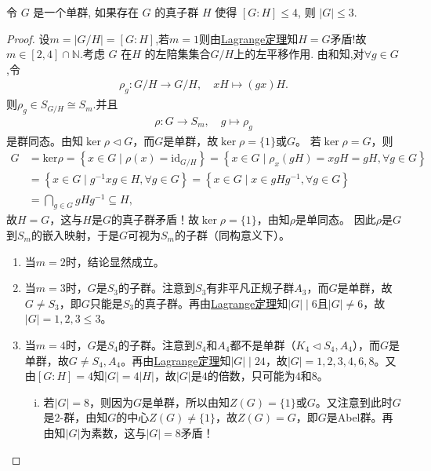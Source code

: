 \documentclass[../../main.tex]{subfiles}%
\begin{document}
\begin{example}
令 $G$ 是一个单群, 如果存在 $G$ 的真子群 $H$ 使得 $[G:H] \leqslant 4$, 则 $|G| \leqslant 3$.
\end{example}
\begin{proof}
设$m=|G/H|=[G:H]$,若$m=1$则由\hyperref[theorem:抽象代数--Lagrange定理]{Lagrange定理}知$H=G$矛盾!故$m\in [2,4]\cap \mathbb{N}$.考虑 $G$ 在$H$ 的左陪集集合$G/H$上的左平移作用. 由和知,对$\forall g\in G$,令
\begin{align*}
\rho_g:G/H\rightarrow G/H,\quad xH\mapsto (gx)H.
\end{align*}
则$\rho_g\in S_{G/H}\cong S_m$.并且
\begin{align*}
\rho:G\rightarrow S_m,\quad g\mapsto \rho_g
\end{align*}
是群同态。由知$\ker\rho\lhd G$，而$G$是单群，故$\ker\rho=\{1\}$或$G$。
若$\ker\rho=G$，则
\begin{align*}
G&=\mathrm{ker}\rho =\left\{ x\in G\mid \rho \left( x \right) =\mathrm{id}_{G/H} \right\} =\left\{ x\in G\mid \rho _x\left( gH \right) =xgH=gH,\forall g\in G \right\} 
\\
&=\left\{ x\in G\mid g^{-1}xg\in H,\forall g\in G \right\} =\left\{ x\in G\mid x\in gHg^{-1},\forall g\in G \right\} 
\\
&=\bigcap_{g\in G}{gHg^{-1}}\subseteq H,
\end{align*}
故$H=G$，这与$H$是$G$的真子群矛盾！故$\ker\rho=\{1\}$，由知$\rho$是单同态。
因此$\rho$是$G$到$S_m$的嵌入映射，于是$G$可视为$S_m$的子群（同构意义下）。
\begin{enumerate}[(1)]
\item 当$m=2$时，结论显然成立。

\item 当$m=3$时，$G$是$S_3$的子群。注意到$S_3$有非平凡正规子群$A_3$，而$G$是单群，故$G\ne S_3$，即$G$只能是$S_3$的真子群。再由\hyperref[theorem:抽象代数--Lagrange定理]{Lagrange定理}知$|G|\mid 6$且$|G|\ne 6$，故$|G|=1,2,3\leqslant 3$。

\item 当$m=4$时，$G$是$S_4$的子群。注意到$S_4$和$A_4$都不是单群（$K_4\lhd S_4,A_4$），而$G$是单群，故$G\ne S_4,A_4$。再由\hyperref[theorem:抽象代数--Lagrange定理]{Lagrange定理}知$|G|\mid 24$，故$|G|=1,2,3,4,6,8$。又由$[G:H]=4$知$|G|=4|H|$，故$|G|$是$4$的倍数，只可能为$4$和$8$。
\begin{enumerate}[(i)]
\item 若$|G|=8$，则因为$G$是单群，所以由知$Z(G)=\{1\}$或$G$。又注意到此时$G$是$2$-群，由知$G$的中心$Z(G)\ne \{1\}$，故$Z(G)=G$，即$G$是Abel群。再由知$|G|$为素数，这与$|G|=8$矛盾！


\end{enumerate}
\end{enumerate}
\end{proof}
\end{document}
